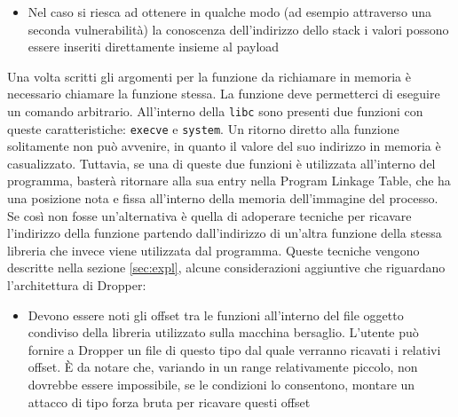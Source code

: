 \begin{inparaenum}[1)]
\begin{itemize}
\item Nel caso si riesca ad ottenere in qualche modo (ad esempio
  attraverso una seconda vulnerabilità) la conoscenza dell'indirizzo
  dello stack i valori possono essere inseriti direttamente insieme al
  payload

\end{itemize}

Una volta scritti gli argomenti per la funzione da richiamare in
memoria è necessario chiamare la funzione stessa. La funzione deve
permetterci di eseguire un comando arbitrario. All'interno della
\lstinline{libc} sono presenti due funzioni con queste
caratteristiche: \lstinline{execve} e \lstinline{system}. Un ritorno
diretto alla funzione solitamente non può avvenire, in quanto il
valore del suo indirizzo in memoria è casualizzato. Tuttavia, se una
di queste due funzioni è utilizzata all'interno del programma, basterà
ritornare alla sua entry nella Program Linkage Table, che ha una
posizione nota e fissa all'interno della memoria dell'immagine del
processo. Se così non fosse un'alternativa è quella di adoperare
tecniche per ricavare l'indirizzo della funzione partendo
dall'indirizzo di un'altra funzione della stessa libreria che invece
viene utilizzata dal programma. Queste tecniche vengono descritte
nella sezione \ref{sec:expl}, alcune considerazioni aggiuntive che
riguardano l'architettura di Dropper:

\begin{itemize}
  \item Devono essere noti gli offset tra le funzioni all'interno del
    file oggetto condiviso della libreria utilizzato sulla macchina
    bersaglio. L'utente può fornire a Dropper un file di questo tipo
    dal quale verranno ricavati i relativi offset. È da notare che,
    variando in un range relativamente piccolo, non dovrebbe essere
    impossibile, se le condizioni lo consentono, montare un attacco di
    tipo forza bruta per ricavare questi offset


\end{itemize}
\end{inparaenum}
